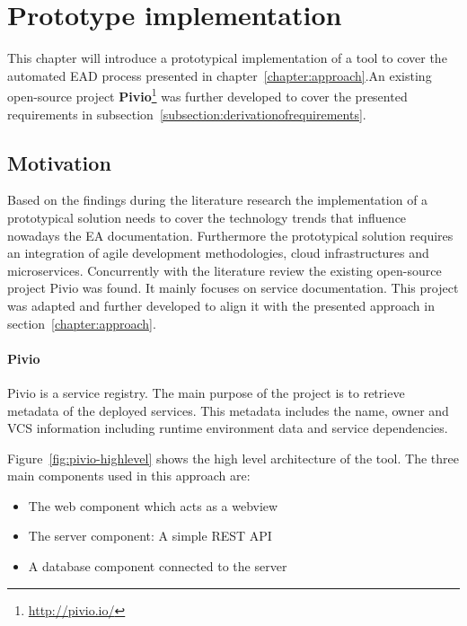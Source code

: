 
\chapter{Prototype implementation}\label{chapter:prototype implementation}

This chapter will introduce a prototypical implementation of a tool to cover the automated EAD process presented in chapter~\ref{chapter:approach}.An existing open-source project \textbf{Pivio}\footnote{\url{http://pivio.io/}} was further developed to cover the presented requirements in subsection~\ref{subsection:derivationofrequirements}.

\section{Motivation} 
Based on the findings during the literature research the implementation of a prototypical solution needs to cover the technology trends that influence nowadays the EA documentation. Furthermore the prototypical solution requires an integration of agile development methodologies, cloud infrastructures and microservices. Concurrently with the literature review the existing open-source project Pivio was found. It mainly focuses on service documentation. %
This project was adapted and further developed to align it with the presented approach in section~\ref{chapter:approach}.

\subsubsection{Pivio}\label{subsubsection:pivio}
Pivio is a service registry. The main purpose of the project is to retrieve metadata of the deployed services. This metadata includes the name, owner and VCS information including runtime environment data and service dependencies.

Figure~\ref{fig:pivio-highlevel} shows the high level architecture of the tool. The three main components used in this approach are:
\begin{itemize}
    \item The web component which acts as a webview
    \item The server component: A simple REST API 
    \item A database component connected to the server
\end{itemize}

